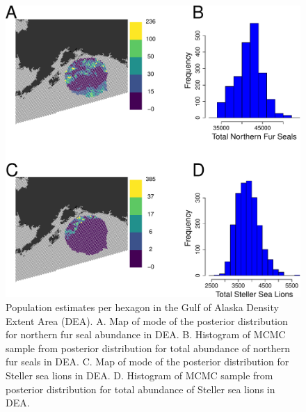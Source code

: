 \documentclass[11pt, titlepage]{article}
\begin{document}
\begin{spacing}{1.9}
\begin{flushleft}
\begin{figure}[H]
  \begin{center}
  \includegraphics[width=.9\linewidth]{figures/Fig-GOAabu-crop}
  \end{center}
  \caption{Population estimates per hexagon in the Gulf of Alaska Density Extent Area (DEA). A. Map of mode of the posterior distribution for northern fur seal abundance in DEA. B. Histogram of MCMC sample from posterior distribution for total abundance of northern fur seals in DEA. C. Map of mode of the posterior distribution for Steller sea lions in DEA. D. Histogram of MCMC sample from posterior distribution for total abundance of Steller sea lions in DEA. \label{Fig-GOAabu}}         
\end{figure} 


\end{flushleft}
\end{spacing}
\end{document}
